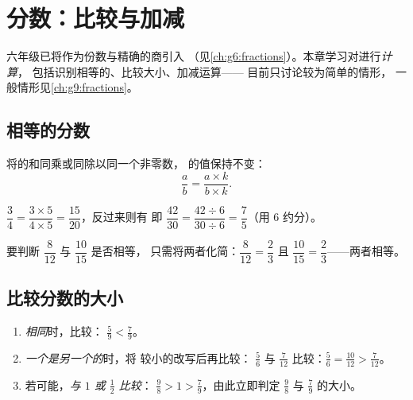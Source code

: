 \chapter{分数：比较与加减}\label{ch:g7:fractions}

六年级已将作为份数与精确的商引入
（见\cref{ch:g6:fractions}）。本章学习对进行\emph{计算}，
包括识别相等的、比较大小、加减运算——
目前只讨论较为简单的情形，
一般情形见\cref{ch:g9:fractions}。

\section{相等的分数}

\begin{theorem}[相等的分数]\label{thm:g7:fractions:equal}
将的和同乘或同除以同一个非零数，
的值保持不变：
\[
\frac{a}{b} = \frac{a \times k}{b \times k} .
\]
\end{theorem}
\admitted

\begin{example}\label{ex:g7:fractions:equal}
$\dfrac{3}{4} = \dfrac{3 \times 5}{4 \times 5} = \dfrac{15}{20}$，反过来则有
即 $\dfrac{42}{30} = \dfrac{42 \div 6}{30 \div 6}
= \dfrac{7}{5}$（用 $6$ 约分）。

要判断 $\dfrac{8}{12}$ 与 $\dfrac{10}{15}$ 是否相等，
只需将两者化简：$\dfrac{8}{12} = \dfrac{2}{3}$ 且
$\dfrac{10}{15} = \dfrac{2}{3}$——两者相等。
\end{example}

\section{比较分数的大小}

\begin{method}[比较两个分数的大小]\label{met:g7:fractions:compare}
\begin{enumerate}
  \item \emph{相同}时，比较：
        $\frac{5}{9} < \frac{7}{9}$。
  \item \emph{一个是另一个的}时，将
        较小的改写后再比较：
        $\frac{5}{6}$ 与 $\frac{7}{12}$ 比较：$\frac56 = \frac{10}{12} >
        \frac{7}{12}$。
  \item 若可能，\emph{与 $1$ 或 $\frac12$ 比较}：
        $\frac{9}{8} > 1 > \frac{7}{9}$，由此立即判定
        $\frac98$ 与 $\frac79$ 的大小。
\end{enumerate}
\end{method}

